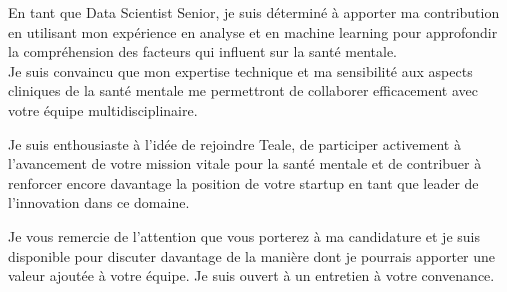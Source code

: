 \documentclass[11pt, a4paper]{awesome-cv}
\begin{document}
\begin{cvletter}
En tant que Data Scientist Senior, je suis déterminé à apporter ma contribution en utilisant mon expérience en analyse et en machine learning pour approfondir la compréhension des facteurs qui influent sur la santé mentale. \\
Je suis convaincu que mon expertise technique et ma sensibilité aux aspects cliniques de la santé mentale me permettront de collaborer efficacement avec votre équipe multidisciplinaire.
 
Je suis enthousiaste à l'idée de rejoindre Teale, de participer activement à l'avancement de votre mission vitale pour la santé mentale et de contribuer à renforcer encore davantage la position de votre startup en tant que leader de l'innovation dans ce domaine.

Je vous remercie de l'attention que vous porterez à ma candidature et je suis disponible pour discuter davantage de la manière dont je pourrais apporter une valeur ajoutée à votre équipe. 
Je suis ouvert à un entretien à votre convenance.



\end{cvletter}


\makeletterclosing
\end{document}
